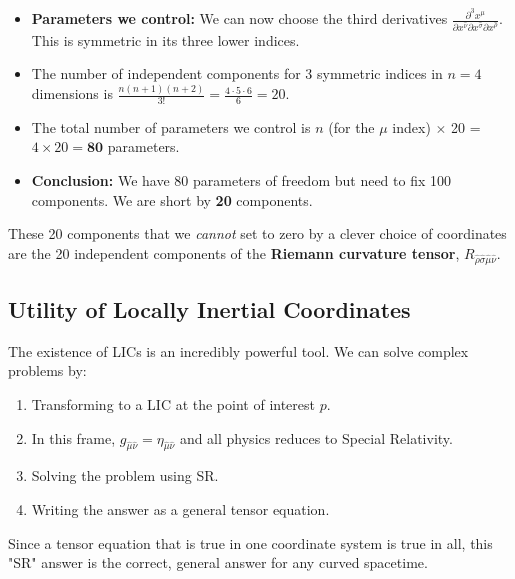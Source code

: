 \documentclass[11pt, a4paper]{report}
\begin{document}
\begin{enumerate}
\begin{itemize}
        \item \textbf{Parameters we control:} We can now choose the third derivatives $\frac{\partial^3 x^\mu}{\partial x^{\hat{\nu}} \partial x^{\hat{\sigma}} \partial x^{\hat{\rho}}}$. This is symmetric in its three lower indices.
        \item The number of independent components for 3 symmetric indices in $n=4$ dimensions is $\frac{n(n+1)(n+2)}{3!} = \frac{4 \cdot 5 \cdot 6}{6} = 20$.
        \item The total number of parameters we control is $n$ (for the $\mu$ index) $\times$ 20 = $4 \times 20 = \textbf{80}$ parameters.
        \item \textbf{Conclusion:} We have 80 parameters of freedom but need to fix 100 components. We are short by \textbf{20} components.
    \end{itemize}
\end{enumerate}
These 20 components that we \emph{cannot} set to zero by a clever choice of coordinates are the 20 independent components of the \textbf{Riemann curvature tensor}, $R_{\hat{\rho}\hat{\sigma}\hat{\mu}\hat{\nu}}$.

\subsection*{Utility of Locally Inertial Coordinates}
The existence of LICs is an incredibly powerful tool. We can solve complex problems by:
\begin{enumerate}
    \item Transforming to a LIC at the point of interest $p$.
    \item In this frame, $g_{\hat{\mu}\hat{\nu}} = \eta_{\hat{\mu}\hat{\nu}}$ and all physics reduces to Special Relativity.
    \item Solving the problem using SR.
    \item Writing the answer as a general tensor equation.
\end{enumerate}
Since a tensor equation that is true in one coordinate system is true in all, this "SR" answer is the correct, general answer for any curved spacetime.
\end{document}
